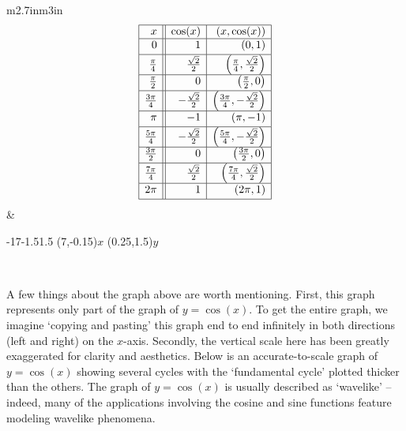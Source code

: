 \hspace{.5in} \begin{tabular}{m{2.7in}m{3in}}
\setlength{\extrarowheight}{2pt}
\[ \begin{array}{|r||r|r|}  

\hline

 x & \cos(x) & (x,\cos(x)) \\ \hline
0  & 1 & (0, 1) \\ [2pt]   \hline
\frac{\pi}{4}  & \frac{\sqrt{2}}{2} & \left(\frac{\pi}{4}, \frac{\sqrt{2}}{2}\right) \\ [2pt] \hline 
\frac{\pi}{2}  & 0 & \left(\frac{\pi}{2}, 0\right) \\ [2pt] \hline 
\frac{3\pi}{4}  & -\frac{\sqrt{2}}{2} & \left(\frac{3\pi}{4}, -\frac{\sqrt{2}}{2}\right) \\ [2pt] \hline 
\pi & -1 & (\pi, -1) \\ [2pt] \hline 
\frac{5\pi}{4}  & -\frac{\sqrt{2}}{2} & \left(\frac{5\pi}{4}, -\frac{\sqrt{2}}{2}\right) \\ [2pt] \hline 
\frac{3\pi}{2}  & 0 & \left(\frac{3\pi}{2}, 0 \right) \\ [2pt] \hline 
\frac{7\pi}{4}  & \frac{\sqrt{2}}{2} & \left(\frac{7\pi}{4}, \frac{\sqrt{2}}{2}\right) \\ [2pt] \hline 
2\pi  & 1 & (2\pi, 1) \\  [2pt] \hline
\end{array} \] \setlength{\extrarowheight}{0pt} &

\begin{mfpic}[25][50]{-1}{7}{-1.5}{1.5}
\axes
\tlabel[cc](7,-0.15){\scriptsize $x$}
\tlabel[cc](0.25,1.5){\scriptsize $y$}
\tlpointsep{4pt}
\scriptsize
{}
\normalsize
{}
\end{mfpic} \\

\end{tabular}

A few things about the graph above are worth mentioning. First, this graph represents only part of the graph of $y = \cos(x)$.  To get the entire graph, we imagine `copying and pasting' this graph end to end infinitely in both directions (left and right) on the $x$-axis.  Secondly, the vertical scale here has been greatly exaggerated for clarity and aesthetics. Below is an accurate-to-scale graph of $y = \cos(x)$ showing several cycles with the `fundamental cycle' plotted thicker than the others.    The graph of $y=\cos(x)$ is usually described as `wavelike' -- indeed, many of the applications involving the cosine and sine functions feature modeling wavelike phenomena.   

